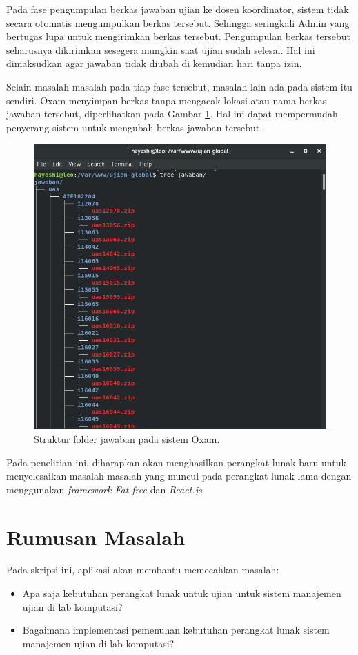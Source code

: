 Pada fase pengumpulan berkas jawaban ujian ke dosen koordinator, sistem tidak secara otomatis mengumpulkan berkas tersebut. Sehingga seringkali Admin yang bertugas lupa untuk mengirimkan berkas tersebut. Pengumpulan berkas tersebut seharusnya dikirimkan sesegera mungkin saat ujian sudah selesai. Hal ini dimaksudkan agar jawaban tidak diubah di kemudian hari tanpa izin.

Selain masalah-masalah pada tiap fase tersebut, masalah lain ada pada sistem itu sendiri. Oxam menyimpan berkas tanpa mengacak lokasi atau nama berkas jawaban tersebut, diperlihatkan pada Gambar \ref{fig:ss-folder-jawaban}. Hal ini dapat mempermudah penyerang sistem untuk mengubah berkas jawaban tersebut.

\begin{figure}
    \centering
    \includegraphics[width=0.6\paperwidth]{Gambar/ss-struktur-folder-jawaban.png}
    \caption{Struktur folder jawaban pada sistem Oxam.}
    \label{fig:ss-folder-jawaban}
\end{figure}

Pada penelitian ini, diharapkan akan menghasilkan perangkat lunak baru untuk menyelesaikan masalah-masalah yang muncul pada perangkat lunak lama dengan menggunakan \textit{framework Fat-free} dan \textit{React.js}.

\section{Rumusan Masalah}
\label{sec:rumusan}
Pada skripsi ini, aplikasi akan membantu memecahkan masalah:
\begin{itemize}
    \item Apa saja kebutuhan perangkat lunak untuk ujian untuk sistem manajemen ujian di lab komputasi?
    
    \item Bagaimana implementasi pemenuhan kebutuhan perangkat lunak sistem manajemen ujian di lab komputasi?
\end{itemize}

